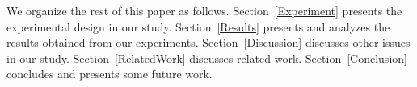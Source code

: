 We organize the rest of this paper as follows.
Section~\ref{Experiment} presents the experimental design in our
study. Section~\ref{Results} presents and analyzes the results
obtained from our experiments. Section~\ref{Discussion} discusses
other issues in our study. Section~\ref{RelatedWork} discusses
related work. Section~\ref{Conclusion} concludes and presents some
future work.
